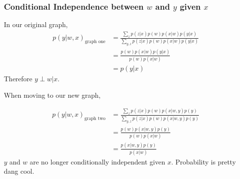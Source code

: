 \documentclass[11pt]{article}
\begin{document}
\subsubsection{Conditional Independence between \(w\) and \(y\)  given \(x\)}
In our original graph,
\begin{align*}
p(y | w, x)_{\text{graph one}} &= \frac{\sum_{z}p(z | x) p(w) p(x | w) p(y | x)} {\sum_{y,z}p(z | x) p(w) p(x | w) p(y | x)}
\\
&= \frac{ p(w) p(x | w) p(y | x)} { p(w) p(x | w)}
\\
&= p(y | x)
\end{align*}
Therefore \(y \perp w | x\).


When moving to our new graph,

\begin{align*}
p(y | w, x)_{\text{graph two}} &= \frac{\sum_{z}p(z | x) p(w) p(x | w, y) p(y) } {\sum_{y,z}p(z | x) p(w) p(x | w, y) p(y)}
\\
&= \frac{p(w) p(x | w, y) p(y) } { p(w) p(x | w)}
\\
&= \frac{p(x | w, y) p(y) } { p(x | w)}
\end{align*}
\(y\)  and \(w\) are no longer conditionally independent given \(x\).
%
%
\newline
Probability is pretty dang cool.
\end{document}
